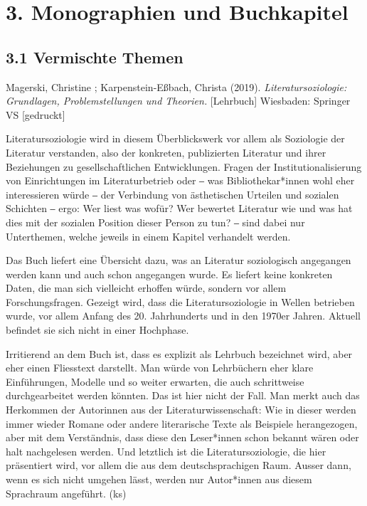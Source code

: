 \documentclass[a4paper,
fontsize=11pt,
oneside,
numbers=noperiodatend,
parskip=half-,
bibliography=totoc,
final
]{scrartcl}
\begin{document}
\hypertarget{monographien-und-buchkapitel}{%
\section{3. Monographien und
Buchkapitel}\label{monographien-und-buchkapitel}}

\hypertarget{vermischte-themen-1}{%
\subsection{3.1 Vermischte Themen}\label{vermischte-themen-1}}

Magerski, Christine ; Karpenstein-Eßbach, Christa (2019).
\emph{Literatursoziologie: Grundlagen, Problemstellungen und Theorien.}
{[}Lehrbuch{]} Wiesbaden: Springer VS {[}gedruckt{]}

Literatursoziologie wird in diesem Überblickswerk vor allem als
Soziologie der Literatur verstanden, also der konkreten, publizierten
Literatur und ihrer Beziehungen zu gesellschaftlichen Entwicklungen.
Fragen der Institutionalisierung von Einrichtungen im Literaturbetrieb
oder ‒ was Bibliothekar*innen wohl eher interessieren würde ‒ der
Verbindung von ästhetischen Urteilen und sozialen Schichten ‒ ergo: Wer
liest was wofür? Wer bewertet Literatur wie und was hat dies mit der
sozialen Position dieser Person zu tun? ‒ sind dabei nur Unterthemen,
welche jeweils in einem Kapitel verhandelt werden.

Das Buch liefert eine Übersicht dazu, was an Literatur soziologisch
angegangen werden kann und auch schon angegangen wurde. Es liefert keine
konkreten Daten, die man sich vielleicht erhoffen würde, sondern vor
allem Forschungsfragen. Gezeigt wird, dass die Literatursoziologie in
Wellen betrieben wurde, vor allem Anfang des 20. Jahrhunderts und in den
1970er Jahren. Aktuell befindet sie sich nicht in einer Hochphase.

Irritierend an dem Buch ist, dass es explizit als Lehrbuch bezeichnet
wird, aber eher einen Fliesstext darstellt. Man würde von Lehrbüchern
eher klare Einführungen, Modelle und so weiter erwarten, die auch
schrittweise durchgearbeitet werden könnten. Das ist hier nicht der
Fall. Man merkt auch das Herkommen der Autorinnen aus der
Literaturwissenschaft: Wie in dieser werden immer wieder Romane oder
andere literarische Texte als Beispiele herangezogen, aber mit dem
Verständnis, dass diese den Leser*innen schon bekannt wären oder halt
nachgelesen werden. Und letztlich ist die Literatursoziologie, die hier
präsentiert wird, vor allem die aus dem deutschsprachigen Raum. Ausser
dann, wenn es sich nicht umgehen lässt, werden nur Autor*innen aus
diesem Sprachraum angeführt. (ks)
\end{document}
